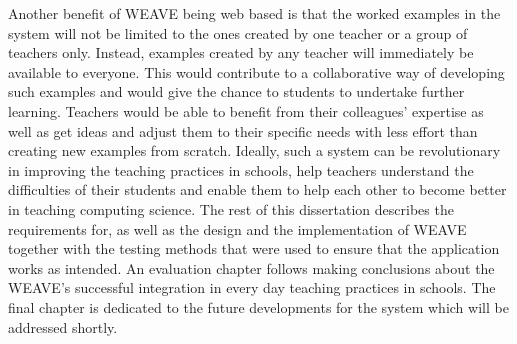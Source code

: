 Another benefit of WEAVE being web based is that the worked examples in the system will not be limited to the ones created by one teacher or a group of teachers only. Instead, examples created by any teacher will immediately be available to everyone. This would contribute to a collaborative way of developing such examples and would give the chance to students to undertake further learning. Teachers would be able to benefit from their colleagues’ expertise as well as get ideas and adjust them to their specific needs with less effort than creating new examples from scratch. Ideally, such a system can be revolutionary in improving the teaching practices in schools, help teachers understand the difficulties of their students and enable them to help each other to become better in teaching computing science.
The rest of this dissertation describes the requirements for, as well as the design and the implementation of WEAVE together with the testing methods that were used to ensure that the application works as intended. An evaluation chapter follows making conclusions about the WEAVE’s successful integration in every day teaching practices in schools. The final chapter is dedicated to the future developments for the system which will be addressed shortly.




